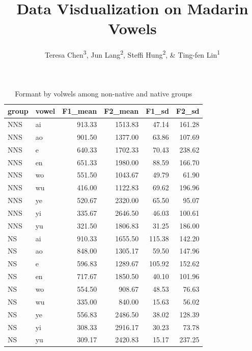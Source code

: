 \documentclass[man, fleqn, noextraspace]{apa6}
\title{Data Visdualization on Madarin Vowels}
\author{Teresa Chen\textsuperscript{3}, Jun Lang\textsuperscript{2}, Steffi
Hung\textsuperscript{2}, \& Ting-fen Lin\textsuperscript{1}}
\date{}
\affiliation{
\vspace{0.5cm}
\textsuperscript{1} Department of Human Physiology\\\textsuperscript{2} Department of East Asia Linguistic Language\\\textsuperscript{3} Department of Communication Disorder}
\begin{document}
\maketitle

{
\setcounter{tocdepth}{5}
\tableofcontents
}
\newpage

\begin{table}

\caption{\label{tab:table1}Formant by volwels among non-native and native groups}
\centering
\begin{tabular}[t]{llrrrr}
\toprule
group & vowel & F1\_mean & F2\_mean & F1\_sd & F2\_sd\\
\midrule
NNS & ai & 913.33 & 1513.83 & 47.14 & 161.28\\
NNS & ao & 901.50 & 1377.00 & 63.86 & 107.69\\
NNS & e & 640.33 & 1702.33 & 70.43 & 238.62\\
NNS & en & 651.33 & 1980.00 & 88.59 & 166.70\\
NNS & wo & 551.50 & 1043.67 & 49.79 & 61.90\\
\addlinespace
NNS & wu & 416.00 & 1122.83 & 69.62 & 196.96\\
NNS & ye & 520.67 & 2320.00 & 65.50 & 95.07\\
NNS & yi & 335.67 & 2646.50 & 46.03 & 100.61\\
NNS & yu & 321.50 & 1806.83 & 31.25 & 186.00\\
NS & ai & 910.33 & 1655.50 & 115.38 & 142.20\\
\addlinespace
NS & ao & 848.00 & 1305.17 & 59.50 & 147.96\\
NS & e & 596.83 & 1289.67 & 105.92 & 152.62\\
NS & en & 717.67 & 1850.50 & 40.10 & 101.96\\
NS & wo & 554.50 & 908.67 & 48.53 & 76.63\\
NS & wu & 335.00 & 840.00 & 15.63 & 56.02\\
\addlinespace
NS & ye & 556.83 & 2486.50 & 38.02 & 128.39\\
NS & yi & 308.33 & 2916.17 & 30.23 & 73.78\\
NS & yu & 309.17 & 2420.83 & 15.17 & 237.25\\
\bottomrule
\end{tabular}
\end{table}
\end{document}
